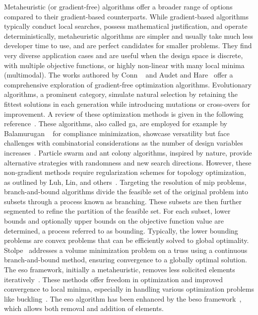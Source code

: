 Metaheuristic (or gradient-free) algorithms offer a broader range of options compared to their gradient-based counterparts. While gradient-based algorithms typically conduct local searches, possess mathematical justification, and operate deterministically, metaheuristic algorithms are simpler and usually take much less developer time to use, and are perfect candidates for smaller problems. They find very diverse application cases and are useful when the design space is discrete, with multiple objective functions, or highly non-linear with many local minima (multimodal). The works authored by Conn \etal~ and Audet and Hare~ offer a comprehensive exploration of gradient-free optimization algorithms. Evolutionary algorithms, a prominent category, simulate natural selection by retaining the fittest solutions in each generation while introducing mutations or cross-overs for improvement. A review of these optimization methods is given in the following reference~. These algorithms, also called \gls{ga}, are employed for example by Balamurugan \etal~ for compliance minimization, showcase versatility but face challenges with combinatorial considerations as the number of design variables increases~. Particle swarm and ant colony algorithms, inspired by nature, provide alternative strategies with randomness and new search directions. However, these non-gradient methods require regularization schemes for topology optimization, as outlined by Luh, Lin, and others~.
Targeting the resolution of \gls{mip} problems, branch-and-bound algorithms divide the feasible set of the original problem into subsets through a process known as branching. These subsets are then further segmented to refine the partition of the feasible set. For each subset, lower bounds and optionally upper bounds on the objective function value are determined, a process referred to as bounding. Typically, the lower bounding problems are convex problems that can be efficiently solved to global optimality. Stolpe~ addresses a volume minimization problem on a truss using a continuous branch-and-bound method, ensuring convergence to a globally optimal solution. The \gls{eso} framework, initially a metaheuristic, removes less solicited elements iteratively~. These methods offer freedom in optimization and improved convergence to local minima, especially in handling various optimization problems like buckling~. The \gls{eso} algorithm has been enhanced by the \gls{beso} framework~, which allows both removal and addition of elements. 

